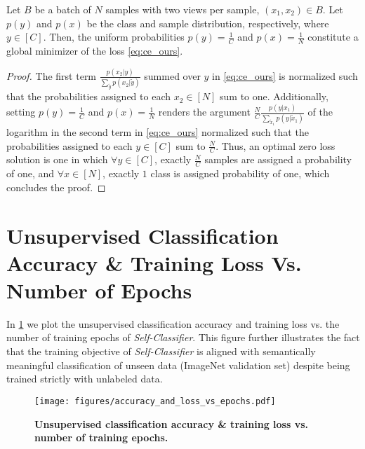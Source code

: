 \documentclass[runningheads]{llncs}
\begin{document}
\begin{theorem}
\label{theorem:appendix_custom_optimal_sol}
Let $B$ be a batch of $N$ samples with two views per sample, $(x_1, x_2) \in B$. Let $p(y)$ and $p(x)$ be the class and sample distribution, respectively, where $y \in [C]$. Then, the uniform probabilities $p(y) = \frac{1}{C}$ and $p(x) = \frac{1}{N}$ constitute a global minimizer of the loss \cref{eq:ce_ours}.
\end{theorem}

\begin{proof}
The first term $\frac{p(x_2|y)}{\sum_{\tilde{y}}{p(x_2|\tilde{y})}}$ summed over $y$ in \cref{eq:ce_ours} is normalized such that the probabilities assigned to each $x_2 \in [N]$ sum to one. Additionally, setting $p(y) = \frac{1}{C}$ and $p(x) = \frac{1}{N}$ renders the argument  $\frac{N}{C}\frac{p(y|x_1)}{\sum_{\tilde{x}_1}{p(y|\tilde{x}_1)}}$ of the logarithm in the second term in \cref{eq:ce_ours} normalized such that the probabilities assigned to each $y \in [C]$ sum to $\frac{N}{C}$. Thus, an optimal zero loss solution is one in which $\forall y \in [C]$, exactly $\frac{N}{C}$ samples are assigned a probability of one, and $\forall x \in [N]$, exactly $1$ class is assigned probability of one, which concludes the proof.
\end{proof}

\section{Unsupervised Classification Accuracy \& Training Loss Vs. Number of Epochs}
\label{section:acc_loss_vs_epochs}
In \cref{fig:clustering_acc} we plot the unsupervised classification accuracy and training loss vs. the number of training epochs of \textit{Self-Classifier}. This figure further illustrates the fact that the training objective of \textit{Self-Classifier} is aligned with semantically meaningful classification of unseen data (ImageNet validation set) despite being trained strictly with unlabeled data.

\begin{figure}[ht]
    \centering
    \texttt{[image: figures/accuracy\_and\_loss\_vs\_epochs.pdf]}
    \caption{\textbf{Unsupervised classification accuracy \& training loss vs. number of training epochs.}}
    \label{fig:clustering_acc} 
\end{figure}
\end{document}
